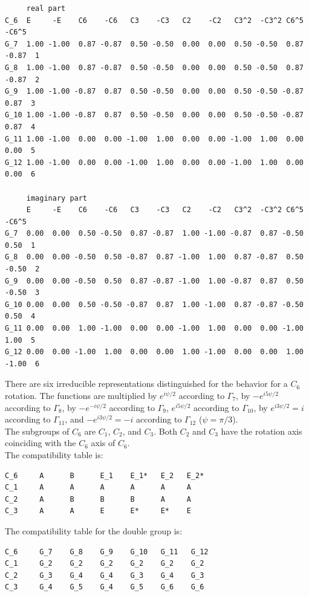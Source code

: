 \documentclass[12pt,a4paper]{article}
\begin{document}
\begin{verbatim}
     real part
C_6  E     -E    C6    -C6   C3    -C3   C2    -C2   C3^2  -C3^2 C6^5  -C6^5
G_7  1.00 -1.00  0.87 -0.87  0.50 -0.50  0.00  0.00  0.50 -0.50  0.87 -0.87  1
G_8  1.00 -1.00  0.87 -0.87  0.50 -0.50  0.00  0.00  0.50 -0.50  0.87 -0.87  2
G_9  1.00 -1.00 -0.87  0.87  0.50 -0.50  0.00  0.00  0.50 -0.50 -0.87  0.87  3  
G_10 1.00 -1.00 -0.87  0.87  0.50 -0.50  0.00  0.00  0.50 -0.50 -0.87  0.87  4
G_11 1.00 -1.00  0.00  0.00 -1.00  1.00  0.00  0.00 -1.00  1.00  0.00  0.00  5
G_12 1.00 -1.00  0.00  0.00 -1.00  1.00  0.00  0.00 -1.00  1.00  0.00  0.00  6

     imaginary part
     E     -E    C6    -C6   C3    -C3   C2    -C2   C3^2  -C3^2 C6^5  -C6^5
G_7  0.00  0.00  0.50 -0.50  0.87 -0.87  1.00 -1.00 -0.87  0.87 -0.50  0.50  1
G_8  0.00  0.00 -0.50  0.50 -0.87  0.87 -1.00  1.00  0.87 -0.87  0.50 -0.50  2
G_9  0.00  0.00 -0.50  0.50  0.87 -0.87 -1.00  1.00 -0.87  0.87  0.50 -0.50  3
G_10 0.00  0.00  0.50 -0.50 -0.87  0.87  1.00 -1.00  0.87 -0.87 -0.50  0.50  4
G_11 0.00  0.00  1.00 -1.00  0.00  0.00 -1.00  1.00  0.00  0.00 -1.00  1.00  5
G_12 0.00  0.00 -1.00  1.00  0.00  0.00  1.00 -1.00  0.00  0.00  1.00 -1.00  6
\end{verbatim}
There are six irreducible representations distinguished for the
behavior for a $C_6$ rotation. The functions are multiplied
by $e^{i\psi/2}$ according to $\Gamma_7$, by $-e^{i5\psi/2}$ 
according to $\Gamma_8$,
by $-e^{-i\psi/2}$ according to $\Gamma_9$, $e^{i5\psi/2}$ 
according to $\Gamma_{10}$,
by $e^{i3\psi/2}=i$ according to $\Gamma_{11}$, and $-e^{i3\psi/2}=-i$ according 
to $\Gamma_{12}$ ($\psi=\pi/3$). \\
The subgroups of $C_6$ are $C_1$, $C_2$, and $C_3$. Both $C_2$ and $C_3$ have
the rotation axis coinciding with the $C_6$ axis of $C_6$. \\
The compatibility table is:
\begin{verbatim}
C_6     A      B      E_1    E_1*   E_2   E_2* 
C_1     A      A      A      A      A     A
C_2     A      B      B      B      A     A
C_3     A      A      E      E*     E*    E
\end{verbatim}
The compatibility table for the double group is:
\begin{verbatim}
C_6     G_7    G_8    G_9    G_10   G_11   G_12 
C_1     G_2    G_2    G_2    G_2    G_2    G_2
C_2     G_3    G_4    G_4    G_3    G_4    G_3
C_3     G_4    G_5    G_4    G_5    G_6    G_6
\end{verbatim}
\end{document}
